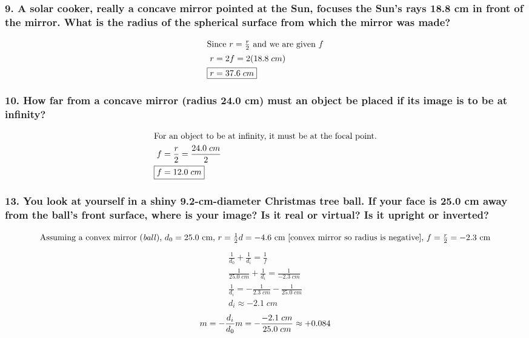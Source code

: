 \documentclass{article}
\begin{document}
\subsubsection*{
    9. A solar cooker, really a concave mirror pointed at the Sun,
    focuses the Sun’s rays 18.8 cm in front of the mirror. What is
    the radius of the spherical surface from which the mirror was made?
}
\begin{align*}
    \intertext{Since $r=\frac r 2$ and we are given $f$}
    r &= 2f = 2(18.8\;cm) \\
    \Aboxed{r &= 37.6\;cm}
\end{align*}
\subsubsection*{
    10. How far from a concave mirror (radius 24.0 cm) must an object be
    placed if its image is to be at infinity?
}
\begin{align*}
    \intertext{For an object to be at infinity, it must be at the focal point.}
    f &= \displaystyle\frac{r}{2} = \displaystyle\frac{24.0\;cm}{2} \\
    \Aboxed{f &= 12.0\;cm}
\end{align*}
\subsubsection*{
    13. You look at yourself in a shiny 9.2-cm-diameter Christmas tree ball.
    If your face is 25.0 cm away from the ball’s front surface, where is your
    image? Is it real or virtual? Is it upright or inverted?
}
\begin{align*}
    \intertext{Assuming a convex mirror (\textit{ball}), $d_0 = 25.0$ cm, $r =
    \frac 1 2 d = -4.6$ cm [convex mirror so radius is negative], $f=\frac r 2 =
-2.3$ cm}
\end{align*}
\begin{gather*}
    \displaystyle\frac{1}{d_0} + \displaystyle\frac{1}{d_i} =
    \displaystyle\frac{1}{f} \\
    \displaystyle\frac{1}{25.0\;cm}+\displaystyle\frac{1}{d_i} =
    \displaystyle\frac{1}{-2.3\;cm} \\
    \displaystyle\frac{1}{d_i} = -\displaystyle\frac{1}{2.3\;cm} -
    \displaystyle\frac{1}{25.0\;cm} \\
    d_i \approx -2.1\;cm
\end{gather*}
\[
    m = -\displaystyle\frac{d_i}{d_0} \\
    m = -\displaystyle\frac{-2.1\;cm}{25.0\;cm} \approx +0.084 \\
\]
\end{document}

